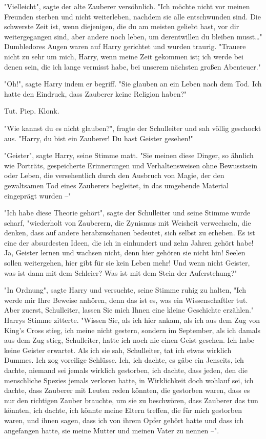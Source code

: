 {"Vielleicht", sagte der alte Zauberer versöhnlich. "Ich möchte nicht vor meinen Freunden sterben und nicht weiterleben, nachdem sie alle entschwunden sind. Die schwerste Zeit ist, wenn diejenigen, die du am meisten geliebt hast, vor dir weitergegangen sind, aber andere noch leben, um derentwillen du bleiben musst…" Dumbledores Augen waren auf Harry gerichtet und wurden traurig. "Trauere nicht zu sehr um mich, Harry, wenn meine Zeit gekommen ist; ich werde bei denen sein, die ich lange vermisst habe, bei unserem nächsten großen Abenteuer."

"Oh!", sagte Harry indem er begriff. "Sie glauben an ein Leben nach dem Tod. Ich hatte den Eindruck, dass Zauberer keine Religion haben?"

Tut. Piep. Klonk.

"Wie kannst du es nicht glauben?", fragte der Schulleiter und sah völlig geschockt aus. "Harry, du bist ein Zauberer! Du hast Geister gesehen!"

"Geister", sagte Harry, seine Stimme matt. "Sie meinen diese Dinger, so ähnlich wie Porträts, gespeicherte Erinnerungen und Verhaltensweisen ohne Bewusstsein oder Leben, die versehentlich durch den Ausbruch von Magie, der den gewaltsamen Tod eines Zauberers begleitet, in das umgebende Material eingeprägt wurden --"

"Ich habe diese Theorie gehört", sagte der Schulleiter und seine Stimme wurde scharf, "wiederholt von Zauberern, die Zynismus mit Weisheit verwechseln, die denken, dass auf andere herabzuschauen bedeutet, sich selbst zu erheben. Es ist eine der absurdesten Ideen, die ich in einhundert und zehn Jahren gehört habe! Ja, Geister lernen und wachsen nicht, denn hier gehören sie nicht hin! Seelen sollen weitergehen, hier gibt für sie kein Leben mehr! Und wenn nicht Geister, was ist dann mit dem Schleier? Was ist mit dem Stein der Auferstehung?"

"In Ordnung", sagte Harry und versuchte, seine Stimme ruhig zu halten, "Ich werde mir Ihre Beweise anhören, denn das ist es, was ein Wissenschaftler tut. Aber zuerst, Schulleiter, lassen Sie mich Ihnen eine kleine Geschichte erzählen." Harrys Stimme zitterte. "Wissen Sie, als ich hier ankam, als ich aus dem Zug von King's Cross stieg, ich meine nicht gestern, sondern im September, als ich damals aus dem Zug stieg, Schulleiter, hatte ich noch nie einen Geist gesehen. Ich habe keine Geister erwartet. Als ich sie sah, Schulleiter, tat ich etwas wirklich Dummes. Ich zog voreilige Schlüsse. Ich, ich dachte, es gäbe ein Jenseits, ich dachte, niemand sei jemals wirklich gestorben, ich dachte, dass jeden, den die menschliche Spezies jemals verloren hatte, in Wirklichkeit doch wohlauf sei, ich dachte, dass Zauberer mit Leuten reden könnten, die gestorben waren, dass es nur den richtigen Zauber brauchte, um sie zu beschwören, dass Zauberer das tun könnten, ich dachte, ich könnte meine Eltern treffen, die für mich gestorben waren, und ihnen sagen, dass ich von ihrem Opfer gehört hatte und dass ich angefangen hatte, sie meine Mutter und meinen Vater zu nennen --".

}
